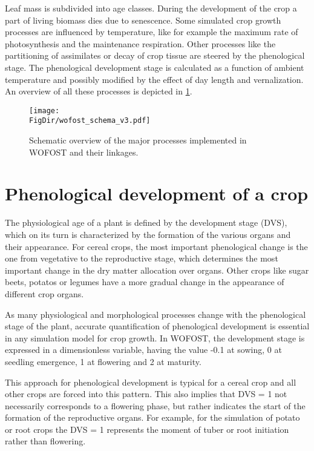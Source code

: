 Leaf mass is subdivided into age classes. During the development of the crop a part of
living biomass dies due to senescence. Some simulated crop growth processes are
influenced by temperature, like for example the maximum rate of photosynthesis and the
maintenance respiration. Other processes like the partitioning of assimilates or decay of
crop tissue are steered by the phenological stage. The phenological development stage is
calculated as a function of ambient temperature and possibly modified by the effect of day
length and vernalization. An overview of all these processes is depicted in \ref{fig:CropGrowthProc2}.

\begin{figure}[p]
	\centering
	\texttt{[image: \\FigDir/wofost\_schema\_v3.pdf]}
	\caption{Schematic overview of the major processes implemented in WOFOST and their linkages.}
	\label{fig:CropGrowthProc2}
\end{figure}

\section{Phenological development of a crop}

The physiological age of a plant is defined by the development stage (DVS), which on its turn is
characterized by the formation of the various organs and their appearance. For cereal crops, the most
important phenological change is the one from vegetative to the reproductive stage, which
determines the most important change in the dry matter allocation over organs. Other crops like
sugar beets, potatos or legumes have a more gradual change in the appearance of different crop organs.

As many physiological and morphological processes change with the phenological stage of the
plant, accurate quantification of phenological development is essential in any simulation
model for crop growth. In WOFOST, the development stage is expressed in a dimensionless variable, 
having the value -0.1 at sowing, 0 at seedling emergence, 1 at flowering and 2 at maturity. 

This approach for phenological development is typical for a cereal crop and all other crops are forced 
into this pattern. This also implies that DVS = 1 not necessarily corresponds to a flowering phase, 
but rather indicates the start of the formation of the reproductive organs. For example, for the 
simulation of potato or root crops the DVS = 1 represents the moment of tuber or root initiation rather 
than flowering.

